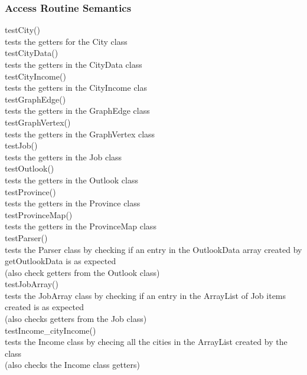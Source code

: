 \documentclass[12pt,fleqn]{article}
\begin{document}
\subsubsection*{Access Routine Semantics}
\noindent testCity()\\
\indent tests the getters for the City class\\
\noindent testCityData()\\
\indent tests the getters in the CityData class\\
\noindent testCityIncome()\\
\indent tests the getters in the CityIncome clas\\
\noindent testGraphEdge()\\
\indent tests the getters in the GraphEdge class\\
\noindent testGraphVertex()\\
\indent tests the getters in the GraphVertex class\\
\noindent testJob()\\
\indent tests the getters in the Job class\\
\noindent testOutlook()\\
\indent tests the getters in the Outlook class\\
\noindent testProvince()\\
\indent tests the getters in the Province class\\
\noindent testProvinceMap()\\
\indent tests the getters in the ProvinceMap class\\
\noindent testParser()\\
\indent tests the Parser class by checking if an entry in the OutlookData array created by getOutlookData is as expected
\\ \indent (also check getters from the Outlook class)\\
\noindent testJobArray()\\
\indent tests the JobArray class by checking if an entry in the ArrayList of Job items created is as expected
\\ \indent (also checks getters from the Job class)\\
\noindent testIncome\_cityIncome()\\
\indent tests the Income class by checing all the cities in the ArrayList created by the class
\\ \indent (also checks the Income class getters)


\newpage
\end{document}
